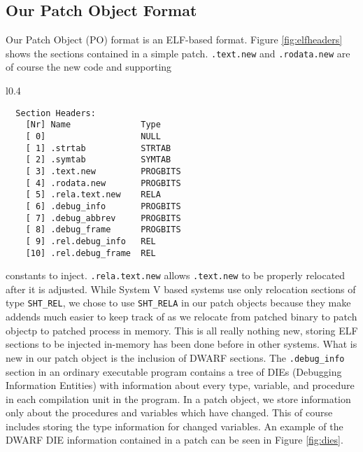 \documentclass[a4paper,12pt]{article}
\begin{document}
\subsection{Our Patch Object Format}
Our Patch Object (PO) format is an ELF-based
format. Figure \ref{fig:elfheaders} shows the sections contained in a
simple patch. \texttt{.text.new} and \texttt{.rodata.new} are of
course the new code and supporting
\begin{wrapfigure}{l}{0.4\textwidth}
{\footnotesize
\begin{verbatim}
  Section Headers:
    [Nr] Name              Type          
    [ 0]                   NULL          
    [ 1] .strtab           STRTAB        
    [ 2] .symtab           SYMTAB        
    [ 3] .text.new         PROGBITS      
    [ 4] .rodata.new       PROGBITS      
    [ 5] .rela.text.new    RELA          
    [ 6] .debug_info       PROGBITS      
    [ 7] .debug_abbrev     PROGBITS      
    [ 8] .debug_frame      PROGBITS      
    [ 9] .rel.debug_info   REL           
    [10] .rel.debug_frame  REL           
\end{verbatim}
}
\caption{Headers for the PO}
\label{fig:elfheaders}
\vspace{-10pt}
\end{wrapfigure}
constants to inject. \texttt{.rela.text.new} allows \texttt{.text.new}
to be properly relocated after it is adjusted. While System V based
systems use only relocation sections of type \texttt{SHT\_REL}, we
chose to use \texttt{SHT\_RELA} in our patch objects because they make
addends much easier to keep track of as we relocate from patched
binary to patch objectp to patched process in memory. This is all
really nothing new, storing ELF sections to be injected in-memory has
been done before in other systems. What is new in our patch object is
the inclusion of DWARF sections. The \texttt{.debug\_info} section in
an ordinary executable program contains a tree of DIEs (Debugging
Information Entities) with information about every type, variable, and
procedure in each compilation unit in the program. In a patch object,
we store information only about the procedures and variables which
have changed. This of course includes storing the type information for
changed variables. An example of the DWARF DIE information contained
in a patch can be seen in Figure \ref{fig:dies}.
\end{document}
